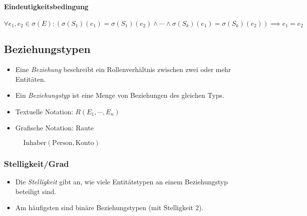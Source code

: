 				\paragraph{Eindeutigkeitsbedingung}
					\begin{equation*}
						\forall e_1, e_2 \in \sigma(E) : (\sigma(S_1)(e_1) = \sigma(S_1)(e_2) \land \cdots \land \sigma(S_k)(e_1) = \sigma(S_k)(e_2)) \implies e_1 = e_2
					\end{equation*}

		\subsection{Beziehungstypen} %
			\begin{itemize}
				\item Eine \textit{Beziehung} beschreibt ein Rollenverhältnis zwischen zwei oder mehr Entitäten.
				\item Ein \textit{Beziehungstyp} ist eine Menge von Beziehungen des gleichen Typs.
				\item Textuelle Notation: \( R(E_1, \cdots, E_n) \)
				\item Grafische Notation: Raute
			\end{itemize}
			\begin{figure}[H]
				\centering

				\( \text{Inhaber}(\text{Person}, \text{Konto}) \)

				\vspace{1cm}

			\end{figure}

			\subsubsection{Stelligkeit/Grad} %
				\begin{itemize}
					\item Die \textit{Stelligkeit} gibt an, wie viele Entitätstypen an einem Beziehungstyp beteiligt sind.
					\item Am häufigsten sind binäre Beziehungstypen (mit Stelligkeit 2).
				\end{itemize}

